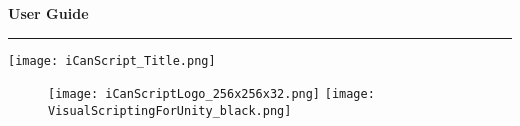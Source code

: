 %
%

\usepackage[
	colorlinks=true,
    linkcolor=blue!50!green,
    urlcolor=blue,
    citecolor=gray,
	plainpages=false,
	pdfpagelabels,
	pdftitle={\mytitle},
	pagebackref,
	pdfauthor={\myauthor},
	pdfkeywords={\keywords}
	]{hyperref}
\usepackage{memhfixc}



\title{\mytitle}
\author{\myauthor}

\ifx\mydate\undefined
\else
	\date{\mydate}
\fi


\ifx\theme\undefined
\else
	\usetheme{\theme}
\fi



\VerbatimFootnotes


\chapterstyle{\mychapterstyle}
\pagestyle{\mypagestyle}



\frontmatter


\textbf{\Huge User Guide}

\begin{raggedleft}
    \rule{2.5in}{0.4pt}
\end{raggedleft}

\texttt{[image: iCanScript\_Title.png]}

\begin{figure}[htbp]
\centering
\texttt{[image: iCanScriptLogo\_256x256x32.png]}
\texttt{[image: VisualScriptingForUnity\_black.png]}
\end{figure}

 



\tableofcontents


\mainmatter

\setlength{\parskip}{1em}

